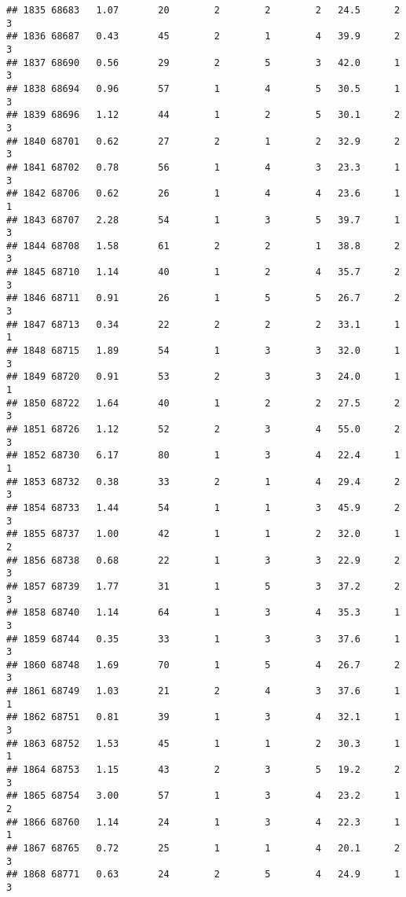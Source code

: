 \documentclass[
]{article}
\begin{document}
\begin{verbatim}
## 1835 68683   1.07       20        2        2        2   24.5      2      3
## 1836 68687   0.43       45        2        1        4   39.9      2      3
## 1837 68690   0.56       29        2        5        3   42.0      1      3
## 1838 68694   0.96       57        1        4        5   30.5      1      3
## 1839 68696   1.12       44        1        2        5   30.1      2      3
## 1840 68701   0.62       27        2        1        2   32.9      2      3
## 1841 68702   0.78       56        1        4        3   23.3      1      3
## 1842 68706   0.62       26        1        4        4   23.6      1      1
## 1843 68707   2.28       54        1        3        5   39.7      1      3
## 1844 68708   1.58       61        2        2        1   38.8      2      3
## 1845 68710   1.14       40        1        2        4   35.7      2      3
## 1846 68711   0.91       26        1        5        5   26.7      2      3
## 1847 68713   0.34       22        2        2        2   33.1      1      1
## 1848 68715   1.89       54        1        3        3   32.0      1      3
## 1849 68720   0.91       53        2        3        3   24.0      1      1
## 1850 68722   1.64       40        1        2        2   27.5      2      3
## 1851 68726   1.12       52        2        3        4   55.0      2      3
## 1852 68730   6.17       80        1        3        4   22.4      1      1
## 1853 68732   0.38       33        2        1        4   29.4      2      3
## 1854 68733   1.44       54        1        1        3   45.9      2      3
## 1855 68737   1.00       42        1        1        2   32.0      1      2
## 1856 68738   0.68       22        1        3        3   22.9      2      3
## 1857 68739   1.77       31        1        5        3   37.2      2      3
## 1858 68740   1.14       64        1        3        4   35.3      1      3
## 1859 68744   0.35       33        1        3        3   37.6      1      3
## 1860 68748   1.69       70        1        5        4   26.7      2      3
## 1861 68749   1.03       21        2        4        3   37.6      1      1
## 1862 68751   0.81       39        1        3        4   32.1      1      3
## 1863 68752   1.53       45        1        1        2   30.3      1      1
## 1864 68753   1.15       43        2        3        5   19.2      2      3
## 1865 68754   3.00       57        1        3        4   23.2      1      2
## 1866 68760   1.14       24        1        3        4   22.3      1      1
## 1867 68765   0.72       25        1        1        4   20.1      2      3
## 1868 68771   0.63       24        2        5        4   24.9      1      3

\end{verbatim}
\end{document}
